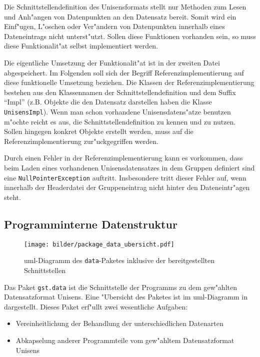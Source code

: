 Die Schnittstellendefinition des Unisensformats stellt nur Methoden zum Lesen und Anh"angen von Datenpunkten an den Datensatz bereit.
Somit wird ein Einf"ugen, L"oschen oder Ver"andern von Datenpunkten innerhalb eines Dateneintrags nicht unterst"utzt.
Sollen diese Funktionen vorhanden sein, so muss diese Funktionalit"at selbst implementiert werden.

Die eigentliche Umsetzung der Funktionalit"at ist in der zweiten Datei abgespeichert.
Im Folgenden soll sich der Begriff Referenzimplementierung auf diese funktionelle Umsetzung beziehen.
Die Klassen der Referenzimplementierung bestehen aus den Klassennamen der Schnittstellendefinition und dem Suffix "`Impl"' (z.B. Objekte die den Datensatz darstellen haben die Klasse \verb|UnisensImpl|).
Wenn man schon vorhandene Unisensdatens"atze benutzen m"ochte reicht es aus, die Schnittstellendefinition zu kennen und zu nutzen.
Sollen hingegen konkret Objekte erstellt werden, muss auf die Referenzimplementierung zur"uckgegriffen werden.

Durch einen Fehler in der Referenzimplementierung kann es vorkommen, dass beim Laden eines vorhandenen Unisensdatensatzes in dem Gruppen definiert sind eine \texttt{Null\-Pointer\-Exception} auftritt.
Insbesondere tritt dieser Fehler auf, wenn innerhalb der Headerdatei der Gruppeneintrag nicht hinter den Dateneintr"agen steht.

\subsection{Programminterne Datenstruktur}

\begin{figure}[htb]
\centering
\texttt{[image: bilder/package\_data\_ubersicht.pdf]}
\caption[\acs{uml}-Diagramm des \texttt{data}-Paketes]{\ac{uml}-Diagramm des \texttt{data}-Paketes inklusive der bereitgestellten Schnitt\-stellen}
\label{pic:data_package}
\end{figure}

Das Paket \verb|gst.data| ist die Schnittstelle der Programms zu dem gew"ahlten Datensatzformat Unisens.
Eine "Ubersicht des Paketes ist im \ac{uml}-Diagramm in  dargestellt.
Dieses Paket erf"ullt zwei wesentliche Aufgaben:
\begin{itemize}
	\item Vereinheitlichung der Behandlung der unterschiedlichen Datenarten
	\item Abkapselung anderer Programmteile vom gew"ahltem Datensatzformat Unisens
\end{itemize}

